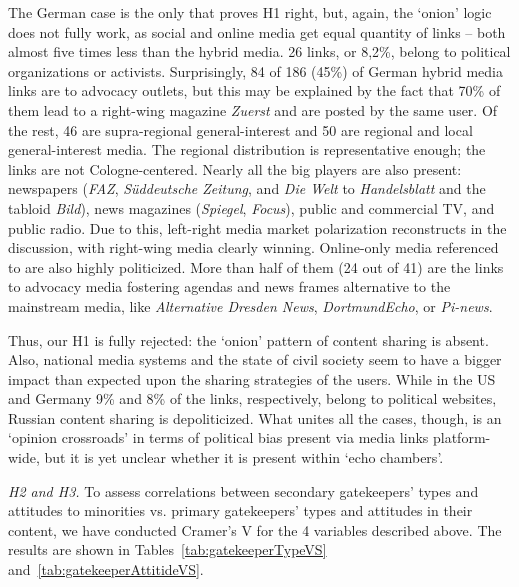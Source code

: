 The German case is the only that proves H1 right, but, again, the ‘onion’ logic does not fully work, as social and online media get equal quantity of links -- both almost five times less than the hybrid media. 26 links, or 8,2\%, belong to political organizations or activists. Surprisingly, 84 of 186 (45\%) of German hybrid media links are to advocacy outlets, but this may be explained by the fact that 70\% of them lead to a right-wing magazine \textit{Zuerst} and are posted by the same user. Of the rest, 46 are supra-regional general-interest and 50 are regional and local general-interest media. The regional distribution is representative enough; the links are not Cologne-centered. Nearly all the big players are also present: newspapers (\textit{FAZ}, \textit{Süddeutsche Zeitung}, and \textit{Die Welt} to \textit{Handelsblatt} and the tabloid \textit{Bild}), news magazines (\textit{Spiegel}, \textit{Focus}), public and commercial TV, and public radio. Due to this, left-right media market polarization reconstructs in the discussion, with right-wing media clearly winning. Online-only media referenced to are also highly politicized. More than half of them (24 out of 41) are the links to advocacy media fostering agendas and news frames alternative to the mainstream media, like \textit{Alternative Dresden News}, \textit{DortmundEcho}, or \textit{Pi-news}.

Thus, our H1 is fully rejected: the ‘onion’ pattern of content sharing is absent. Also, national media systems and the state of civil society seem to have a bigger impact than expected upon the sharing strategies of the users. While in the US and Germany 9\% and 8\% of the links, respectively, belong to political websites, Russian content sharing is depoliticized. What unites all the cases, though, is an ‘opinion crossroads’ in terms of political bias present via media links platform-wide, but it is yet unclear whether it is present within ‘echo chambers’.

\textit{H2 and H3.} To assess correlations between secondary gatekeepers’ types and attitudes to minorities vs. primary gatekeepers’ types and attitudes in their content, we have conducted Cramer’s V for the 4 variables described above. The results are shown in Tables~\cref{tab:gatekeeperTypeVS} and~\cref{tab:gatekeeperAttitideVS}.

